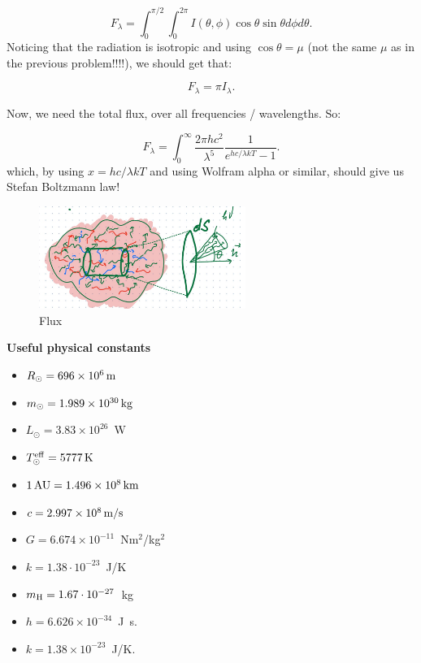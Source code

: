 \documentclass[12pt]{article}
\begin{document}
\begin{equation}
F_\lambda = \int_0^{\pi/2} \int_0^{2\pi} I(\theta, \phi) \cos \theta \sin \theta d \phi d \theta.
\end{equation}
Noticing that the radiation is isotropic and using $\cos \theta = \mu$ (not the same $\mu$ as in the previous problem!!!!), we should get that:

\begin{equation}
F_\lambda = \pi I_\lambda.
\end{equation}

Now, we need the total flux, over all frequencies / wavelengths. So:

\begin{equation}
F_\lambda = \int_0^{\infty} \frac{2 \pi hc^2}{\lambda^5} \frac{1}{e^{hc/\lambda k T} - 1}.
\end{equation}
which, by using $x = hc/\lambda k T$ and using Wolfram alpha or similar, should give us Stefan Boltzmann law!

\begin{figure}
\includegraphics[width=0.6\textwidth]{flux.jpg}
\caption{Flux}
\end{figure}

 
{\bf Useful physical constants}
\begin{itemize}
  \item $R_{\odot} = 696 \times 10^6\,{\rm m}$
  \item $m_{\odot} = 1.989 \times 10^{30}\,{\rm kg}$
  \item $L_{\odot} = 3.83 \times 10^{26}$~W
  \item $T^{\rm eff}_{\odot} = 5777\,{\rm K}$
  \item $1\,{\rm AU} = 1.496 \times 10^8\,{\rm km}$
  \item $c = 2.997 \times 10^8\,{\rm m/s}$
  \item $G = 6.674 \times 10^{-11}$~Nm$^2$/kg$^2$
  \item $k = 1.38\cdot10^{-23}$~J/K
  \item $m_{\rm H} = 1.67\cdot10^{-27}$~kg
  \item $h=6.626 \times 10^{-34}$~J~s.
  \item $k=1.38 \times 10^{-23}$~J/K.
\end{itemize}
\end{document}
